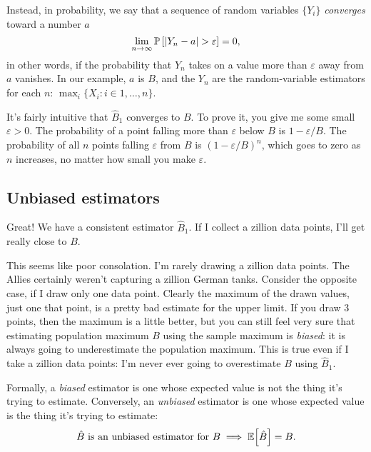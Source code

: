 Instead, in
probability, we say that a sequence of random variables $\{Y_i\}$ \emph{converges}
toward a number $a$
\begin{equation}
\lim_{n\to\infty} \mathbb{P}\left[{|Y_n - a| > \varepsilon}\right] = 0,
\end{equation}
in other words, if the probability that $Y_n$ takes on a value more than $\varepsilon$
away from $a$ vanishes. In our example, $a$ is $B$,
and the $Y_n$ are the random-variable estimators
for each $n$: $\max_i \{X_i : i \in 1,\ldots, n\}$.

It's fairly intuitive that $\hat{B}_1$ converges to $B$. To prove it, you give me
some small $\varepsilon > 0$.
The probability of a point falling more than $\varepsilon$ below $B$
is $1 - \varepsilon/B$. The probability of all $n$ points falling $\varepsilon$ from $B$
is $(1 - \varepsilon/B)^n$,
which goes to zero as $n$ increases, no matter how small you make $\varepsilon$.

\subsection{Unbiased estimators}

Great! We have a consistent estimator $\hat{B}_1$. If I collect a zillion data
points, I'll get really close to $B$.

This seems like poor consolation. I'm rarely drawing a zillion data points.
The Allies certainly weren't capturing a zillion German tanks.
Consider the opposite case, if I draw only one data point. Clearly the maximum
of the drawn values, just one that point, is a pretty bad estimate for the
upper limit. If you draw 3 points, then the maximum is a little better, but
you can still feel very sure that estimating population maximum $B$ using the
sample maximum is \emph{biased}: it is always going to underestimate the
population maximum. This is true even if I take a zillion data points: I'm
never ever going to overestimate $B$ using $\hat{B}_1$.

Formally, a \emph{biased} estimator is one whose expected value is not the
thing it's trying to estimate. Conversely, an \emph{unbiased} estimator is
one whose expected value is the thing it's trying to estimate:
\begin{equation}
\text{$\hat{B}$ is an unbiased estimator for $B$} \implies \mathbb{E}\!\left[{\hat{B}}\right] = B.
\end{equation}

